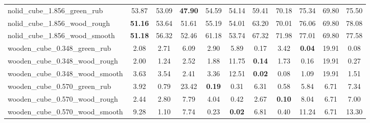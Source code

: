 \begin{table}[H]
{\begin{tabular}{l cccccccccc}
        nolid\_cube\_1.856\_green\_rub & 53.87 & 53.09 & \textbf{47.90} & 54.59 & 54.14 & 59.41 & 70.18 & 75.34 & 69.80 & 75.50 \\
        nolid\_cube\_1.856\_wood\_rough & \textbf{51.16} & 53.64 & 51.61 & 55.19 & 54.01 & 63.20 & 70.01 & 76.06 & 69.80 & 78.08 \\
        nolid\_cube\_1.856\_wood\_smooth & \textbf{51.18} & 56.32 & 52.46 & 61.18 & 53.74 & 67.32 & 71.98 & 77.01 & 69.80 & 77.58 \\
        wooden\_cube\_0.348\_green\_rub & 2.08 & 2.71 & 6.09 & 2.90 & 5.89 & 0.17 & 3.42 & \textbf{0.04} & 19.91 & 0.08 \\
        wooden\_cube\_0.348\_wood\_rough & 2.00 & 1.24 & 2.52 & 1.88 & 11.75 & \textbf{0.14} & 1.73 & 0.16 & 19.91 & 0.27 \\
        wooden\_cube\_0.348\_wood\_smooth & 3.63 & 3.54 & 2.41 & 3.36 & 12.51 & \textbf{0.02} & 0.08 & 1.09 & 19.91 & 1.51 \\
        wooden\_cube\_0.570\_green\_rub & 3.92 & 0.79 & 23.42 & \textbf{0.19} & 0.31 & 6.31 & 0.58 & 5.84 & 6.71 & 7.34 \\
        wooden\_cube\_0.570\_wood\_rough & 2.44 & 2.80 & 7.79 & 4.04 & 0.42 & 2.67 & \textbf{0.10} & 8.04 & 6.71 & 7.00 \\
        wooden\_cube\_0.570\_wood\_smooth & 9.28 & 1.10 & 7.74 & 0.23 & \textbf{0.02} & 6.81 & 0.40 & 11.24 & 6.71 & 13.30 \\
        \bottomrule
    \end{tabular}
    }
\end{table}
